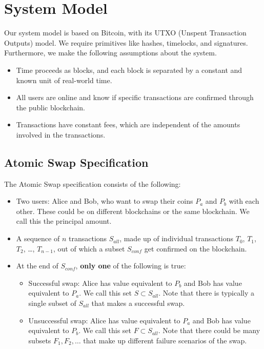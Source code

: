\section{System Model}
Our system model is based on Bitcoin, with its UTXO (Unspent Transaction Outputs) model. We require primitives like hashes, timelocks, and signatures. Furthermore, we make the following assumptions about the system.
\begin{itemize}
    \item Time proceeds as blocks, and each block is separated by a constant and known unit of real-world time.
    \item All users are online and know if specific transactions are confirmed through the public blockchain.
    \item Transactions have constant fees, which are independent of the amounts involved in the transactions.
\end{itemize}
\subsection{Atomic Swap Specification} \label{spec}
The Atomic Swap specification consists of the following:
\begin{itemize}
    \item Two users: Alice and Bob, who want to swap their coins $P_a$ and $P_b$ with each other. These could be on different blockchains or the same blockchain. We call this the principal amount.
    \item A sequence of $n$ transactions $S_{all}$, made up of individual transactions $T_0$, $T_1$, $T_2$, \ldots, $T_{n-1}$, out of which a subset $S_{conf}$ get confirmed on the blockchain.
    \item At the end of $S_{conf}$, \textbf{only one} of the following is true:
    \begin{itemize}
        \item Successful swap: Alice has value equivalent to $P_b$ and Bob has value equivalent to $P_a$. We call this set $S \subset S_{all}$. Note that there is typically a single subset of $S_{all} $ that makes a successful swap.
        \item Unsuccessful swap: Alice has value equivalent to $P_a$ and Bob has value equivalent to $P_b$. We call this set $F \subset S_{all}$. Note that there could be many subsets $F_1, F_2, \ldots$ that make up different failure scenarios of the swap.
    \end{itemize}
\end{itemize}

